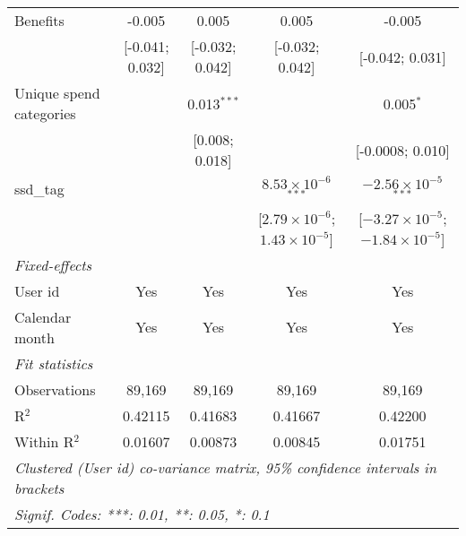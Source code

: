 \begin{table}[htbp]
\begin{threeparttable}[b]
\begin{tabular}{lcccc}
         Benefits                 & -0.005                           & 0.005                            & 0.005                                          & -0.005\\   
                                  & [-0.041; 0.032]                  & [-0.032; 0.042]                  & [-0.032; 0.042]                                & [-0.042; 0.031]\\   
         Unique spend categories  &                                  & 0.013$^{***}$                    &                                                & 0.005$^{*}$\\   
                                  &                                  & [0.008; 0.018]                   &                                                & [-0.0008; 0.010]\\   
         ssd\_tag                 &                                  &                                  & $8.53\times 10^{-6}$$^{***}$                   & $-2.56\times 10^{-5}$$^{***}$\\    
                                  &                                  &                                  & [$2.79\times 10^{-6}$; $1.43\times 10^{-5}$]   & [$-3.27\times 10^{-5}$; $-1.84\times 10^{-5}$]\\     
         \midrule
         \emph{Fixed-effects}\\
         User id                  & Yes                              & Yes                              & Yes                                            & Yes\\  
         Calendar month           & Yes                              & Yes                              & Yes                                            & Yes\\  
         \midrule
         \emph{Fit statistics}\\
         Observations             & 89,169                           & 89,169                           & 89,169                                         & 89,169\\  
         R$^2$                    & 0.42115                          & 0.41683                          & 0.41667                                        & 0.42200\\  
         Within R$^2$             & 0.01607                          & 0.00873                          & 0.00845                                        & 0.01751\\  
         \midrule \midrule
         \multicolumn{5}{l}{\emph{Clustered (User id) co-variance matrix, 95\% confidence intervals in brackets}}\\
         \multicolumn{5}{l}{\emph{Signif. Codes: ***: 0.01, **: 0.05, *: 0.1}}\\
      \end{tabular}
      

\end{threeparttable}
\end{table}
